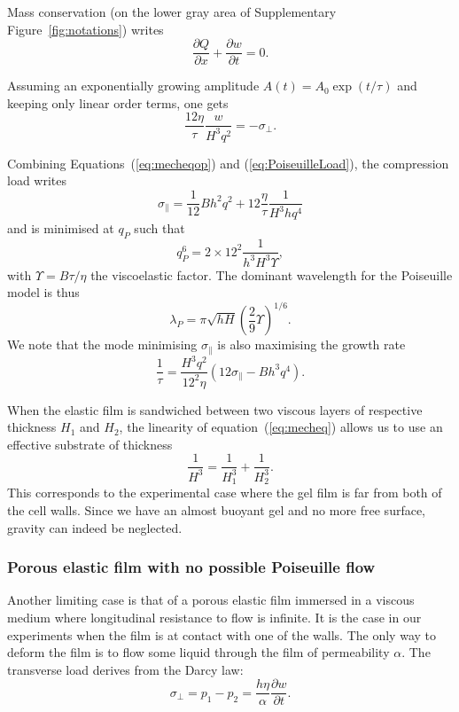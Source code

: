 \documentclass[twocolumn,superscriptaddress,showpacs,preprintnumbers,
amsmath,amssymb,prl]{revtex4-1}
\begin{document}
Mass conservation (on the lower gray area of Supplementary Figure~\ref{fig:notations}) writes
\begin{equation}
\frac{\partial Q}{\partial x} + \frac{\partial w}{\partial t} = 0.
\label{eq:conservation}
\end{equation}

Assuming an exponentially growing amplitude $A(t) = A_0 \exp(t/\tau)$ and keeping only linear order terms, one gets
\begin{equation}
\frac{12\eta}{\tau} \frac{w}{H^3q^2} = -\sigma_\perp.
\label{eq:PoiseuilleLoad}
\end{equation}

Combining Equations~(\ref{eq:mecheqop}) and (\ref{eq:PoiseuilleLoad}), the compression load writes
\begin{equation}
\sigma_\parallel = \frac{1}{12}B h^2 q^2 + 12\frac{\eta}{\tau}\frac{1}{H^3 h q^4}
\label{eq:sigma0P}
\end{equation}
and is minimised at $q_P$ such that
\begin{equation}
q_P^6 = 2\times 12^2 \frac{1}{h^3H^3\Upsilon},
\label{eq:qP}
\end{equation}
with $\Upsilon = B\tau/\eta$ the viscoelastic factor. The dominant wavelength for the Poiseuille model is thus
\begin{equation}
\lambda_P = \pi\sqrt{hH}\left(\frac{2}{9}\Upsilon\right)^{1/6}.
\end{equation}
%
We note that the mode minimising $\sigma_\parallel$ is also maximising the growth rate
\begin{equation}
\frac{1}{\tau} = \frac{H^3q^2}{12^2\eta}\left(12\sigma_\parallel - Bh^3q^4\right).
\end{equation}

When the elastic film is sandwiched between two viscous layers of respective thickness $H_1$ and $H_2$, the linearity of equation~(\ref{eq:mecheq}) allows us to use an effective substrate of thickness 
\begin{equation}
\frac{1}{H^3} = \frac{1}{H_1^3}+\frac{1}{H_2^3}.
\end{equation}
This corresponds to the experimental case where the gel film is far from both of the cell walls. Since we have an almost buoyant gel and no more free surface, gravity can indeed be neglected.

\subsubsection*{Porous elastic film with no possible Poiseuille flow}
Another limiting case is that of a porous elastic film immersed in a viscous medium where longitudinal resistance to flow is infinite. It is the case in our experiments when the film is at contact with one of the walls. The only way to deform the film is to flow some liquid through the film of permeability $\alpha$. The transverse load derives from the Darcy law:
\begin{equation}
\sigma_\perp = p_1-p_2 = \frac{h\eta}{\alpha}\frac{\partial w}{\partial t}.
\label{eq:DarcyLoad}
\end{equation}
\end{document}
